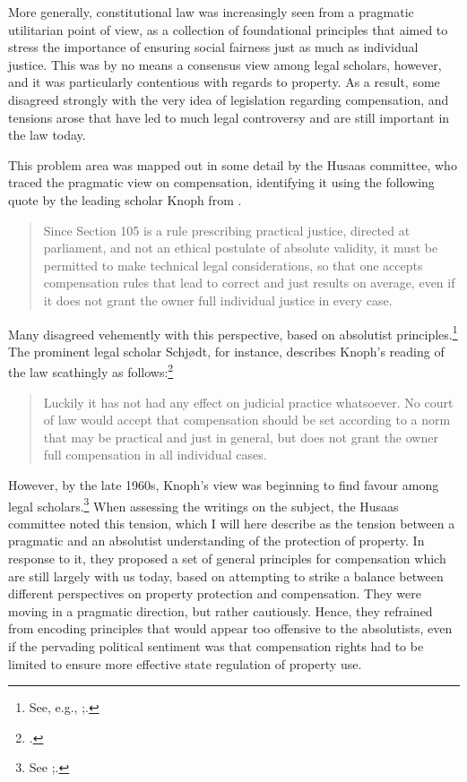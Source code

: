 More generally, constitutional law was increasingly seen from a pragmatic utilitarian point of view, as a collection of foundational principles that aimed to stress the importance of ensuring social fairness just as much as individual justice. This was by no means a consensus view among legal scholars, however, and it was particularly contentious with regards to property. As a result, some disagreed strongly with the very idea of legislation regarding compensation, and tensions arose that have led to much legal controversy and are still important in the law today. 

This problem area was mapped out in some detail by the Husaas committee, who traced the pragmatic view on compensation, identifying it using the following quote by the leading scholar Knoph from \cite[113]{knoph39}.

\begin{quote}
Since Section 105 is a rule prescribing practical justice, directed at parliament, and not an ethical postulate of absolute validity, it must be permitted to make technical legal considerations, so that one accepts compensation rules that lead to correct and just results on average, even if it does not grant the owner full individual justice in every case.
\end{quote}

Many disagreed vehemently with this perspective, based on absolutist principles.\footnote{See, e.g., \cite[20-22]{robberstad57};\cite[44]{schjodt47}.} The prominent legal scholar Schjødt, for instance, describes Knoph's reading of the law scathingly as follows:\footcite[44]{schjodt47}

\begin{quote}Luckily it has not had any effect on judicial practice whatsoever. No court of law would accept that compensation should be set according to a norm that may be practical and just in general, but does not grant the owner full compensation in all individual cases.
\end{quote}

However, by the late 1960s, Knoph's view was beginning to find favour among legal scholars.\footnote{See \cite[17]{fleischer68};\cite[41]{opshal68}.} When assessing the writings on the subject, the Husaas committee noted this tension, which I will here describe as the tension between a pragmatic and an absolutist understanding of the protection of property. In response to it, they proposed a set of general principles for compensation which are still largely with us today, based on attempting to strike a balance between different perspectives on property protection and compensation. They were moving in a pragmatic direction, but rather cautiously. Hence, they refrained from encoding principles that would appear too offensive to the absolutists, even if the pervading political sentiment was that compensation rights had to be limited to ensure more effective state regulation of property use.


